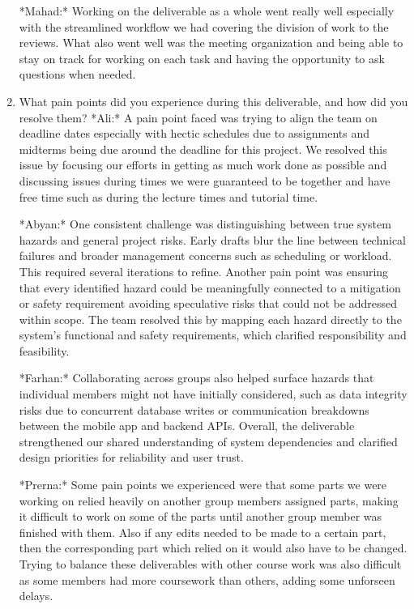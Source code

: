\documentclass{article}
\begin{document}
\begin{enumerate}
    *Mahad:* Working on the deliverable as a whole went really well especially with the streamlined workflow we had covering the division of work to the reviews. What also went well was the meeting organization and being able to stay on track for working on each task and having the opportunity to ask questions when needed.


    \item What pain points did you experience during this deliverable, and how
    did you resolve them?
    *Ali:* A pain point faced was trying to align the team on deadline dates especially with hectic schedules due to assignments and midterms being due around the deadline for this project. We resolved this issue by focusing our efforts in getting as much work done as possible and discussing issues during times we were guaranteed to be together and have free time such as during the lecture times and tutorial time.

    *Abyan:* One consistent challenge was distinguishing between true system hazards and general project risks. Early drafts blur the line between technical failures and broader management concerns such as scheduling or workload. This required several iterations to refine. Another pain point was ensuring that every identified hazard could be meaningfully connected to a mitigation or safety requirement avoiding speculative risks that could not be addressed within scope. The team resolved this by mapping each hazard directly to the system’s functional and safety requirements, which clarified responsibility and feasibility.

    *Farhan:* Collaborating across groups also helped surface hazards that individual members might not have initially considered, such as data integrity risks due to concurrent database writes or communication breakdowns between the mobile app and backend APIs. Overall, the deliverable strengthened our shared understanding of system dependencies and clarified design priorities for reliability and user trust.

    *Prerna:* Some pain points we experienced were that some parts we were working on relied heavily on another group members assigned parts, making it difficult to work on some of the parts until another group member was finished with them. Also if any edits needed to be made to a certain part, then the corresponding part which relied on it would also have to be changed. Trying to balance these deliverables with other course work was also difficult as some members had more coursework than others, adding some unforseen delays.


\end{enumerate}
\end{document}
